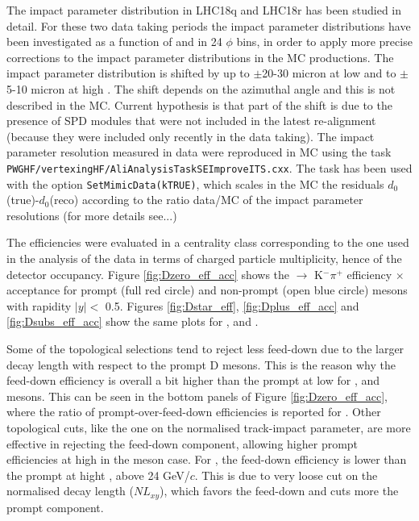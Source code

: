The impact parameter distribution in LHC18q and LHC18r has been studied in detail. For these two data taking periods the impact parameter distributions have been investigated as a function of \pt and in 24 $\phi$ bins, in order to apply more precise corrections to the impact parameter distributions in the MC productions.
The impact parameter distribution is shifted by up to $\pm$20-30 micron at low \pt and to $\pm$5-10 micron at high \pt. The shift depends on the azimuthal angle and this is not described in the MC. Current hypothesis is that part of the shift is due to the presence of SPD modules that were not included in the latest re-alignment (because they were included only recently in the data taking). The impact parameter resolution measured in data were reproduced in MC using the task \texttt{PWGHF/vertexingHF/AliAnalysisTaskSEImproveITS.cxx}. The task has been used with the option \texttt{SetMimicData(kTRUE)}, which scales in the MC the residuals $d_0$(true)-$d_0$(reco) according to the ratio data/MC of the impact parameter resolutions (for more details see...)

The efficiencies were evaluated in a centrality class corresponding to the one used in the analysis of the data in terms of charged particle multiplicity,  hence of the detector occupancy. Figure \ref{fig:Dzero_eff_acc} shows the \Dzero$\rightarrow$ K$^{-}\pi^{+}$ efficiency $\times$ acceptance for prompt (full red circle) and non-prompt (open blue circle) \Dzero mesons with rapidity $|y|<$ 0.5. Figures \ref{fig:Dstar_eff}, \ref{fig:Dplus_eff_acc} and \ref{fig:Dsubs_eff_acc} show the same plots for \Dstar, \Dplus and \Dsubs.

Some of the topological selections tend to reject less feed-down due to the larger decay length with respect to the prompt D mesons. This is the reason why the feed-down efficiency is overall a bit higher than the prompt at low \pt for \Dzero, \Dstar and \Dsubs mesons. This can be seen in the bottom panels of Figure \ref{fig:Dzero_eff_acc}, where the ratio of prompt-over-feed-down efficiencies is reported for \Dzero. Other topological cuts, like the one on the normalised track-impact parameter, are more effective in rejecting the feed-down component, allowing higher prompt efficiencies at high \pt in the \Dplus meson case. For \Dstar, the feed-down efficiency is lower than the prompt at hight \pt, above 24 GeV/$c$. This is due to very loose cut on the normalised decay length ($NL_{xy}$), which favors the feed-down and cuts more the prompt component. 


